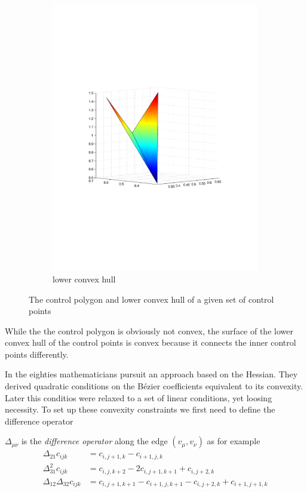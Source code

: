 \begin{figure}[h]
\begin{subfigure}[b]{.5\textwidth}
	\includegraphics[trim=3cm 8cm 3cm 8cm, width=1.\textwidth]{convex_hull2.pdf}
	\caption{lower convex hull}
\end{subfigure}
\caption{The control polygon and lower convex hull of a given set of control points}
\label{fig: diff connectivity}
\end{figure}
While the the control polygon is obviously not convex, the surface of the lower convex hull of the control points is convex because it connects the inner control points differently.

In the eighties mathematicians pursuit an approach based on the Hessian. They derived quadratic conditions on the B\'ezier coefficients equivalent to its convexity. Later this conditios were relaxed to a set of linear conditions, yet loosing necessity. To set up these convexity constraints we first need to define the difference operator
\begin{definition}
	$\Delta_{\mu \nu}$ is the \emph{difference operator} along the edge $(v_\mu, v_\nu)$ as for example
	\begin{align*}
		\Delta_{21} c_{ijk} &= c_{i,j+1,k} -c_{i+1, j,k}  \\
		\Delta_{31}^2 c_{ijk} &= c_{i,j,k+2} -2c_{i, j+1,k+1} +c_{i, j+2,k} \\
		\Delta_{12} \Delta_{32} c_{ijk} &= c_{i,j+1,k+1} -c_{i+1, j,k+1} - c_{i,j+2,k} +c_{i+1, j+1,k}\\	\end{align*}
\end{definition}
 
